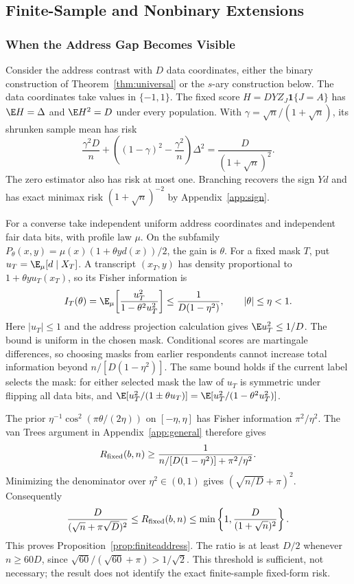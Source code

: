 \subsection{Finite-Sample and Nonbinary Extensions}\label{app:extensions}
\subsubsection{When the Address Gap Becomes Visible}\label{app:addressfinite}
Consider the address contrast with $D$ data coordinates, either the binary construction of Theorem~\ref{thm:universal} or the $s$-ary construction below. The data coordinates take values in $\{-1,1\}$. The fixed score $H=DYZ_J\mathbf1\{J=A\}$ has $\E H=\Delta$ and $\E H^2=D$ under every population. With $\gamma=\sqrt n/(1+\sqrt n)$, its shrunken sample mean has risk
\[
 \frac{\gamma^2D}{n}+\left((1-\gamma)^2-\frac{\gamma^2}{n}\right)\Delta^2
   =\frac{D}{(1+\sqrt n)^2}.
\]
The zero estimator also has risk at most one. Branching recovers the sign $Yd$ and has exact minimax risk $(1+\sqrt n)^{-2}$ by Appendix~\ref{app:sign}.

For a converse take independent uniform address coordinates and independent fair data bits, with profile law $\mu$. On the subfamily $P_\theta(x,y)=\mu(x)(1+\theta y d(x))/2$, the gain is $\theta$. For a fixed mask $T$, put $u_T=\E_\mu[d\mid X_T]$. A transcript $(x_T,y)$ has density proportional to $1+\theta y u_T(x_T)$, so its Fisher information is
\[
 I_T(\theta)=\E_\mu\!\left[\frac{u_T^2}{1-\theta^2u_T^2}\right]
 \le\frac{1}{D(1-\eta^2)},\qquad |\theta|\le\eta<1.
\]
Here $|u_T|\le1$ and the address projection calculation gives $\E u_T^2\le1/D$. The bound is uniform in the chosen mask. Conditional scores are martingale differences, so choosing masks from earlier respondents cannot increase total information beyond $n/[D(1-\eta^2)]$. The same bound holds if the current label selects the mask: for either selected mask the law of $u_T$ is symmetric under flipping all data bits, and $\E[u_T^2/(1\pm\theta u_T)]=\E[u_T^2/(1-\theta^2u_T^2)]$.

The prior $\eta^{-1}\cos^2(\pi\theta/(2\eta))$ on $[-\eta,\eta]$ has Fisher information $\pi^2/\eta^2$. The van Trees argument in Appendix~\ref{app:general} therefore gives
\[
 R_{\rm fixed}(b,n)\ge
 \frac{1}{n/[D(1-\eta^2)]+\pi^2/\eta^2}.
\]
Minimizing the denominator over $\eta^2\in(0,1)$ gives $(\sqrt{n/D}+\pi)^2$. Consequently
\[
 \frac{D}{(\sqrt n+\pi\sqrt D)^2}
 \le R_{\rm fixed}(b,n)
 \le\min\left\{1,\frac{D}{(1+\sqrt n)^2}\right\}.
\]
This proves Proposition~\ref{prop:finiteaddress}. The ratio is at least $D/2$ whenever $n\ge60D$, since $\sqrt{60}/(\sqrt{60}+\pi)>1/\sqrt2$. This threshold is sufficient, not necessary; the result does not identify the exact finite-sample fixed-form risk.

